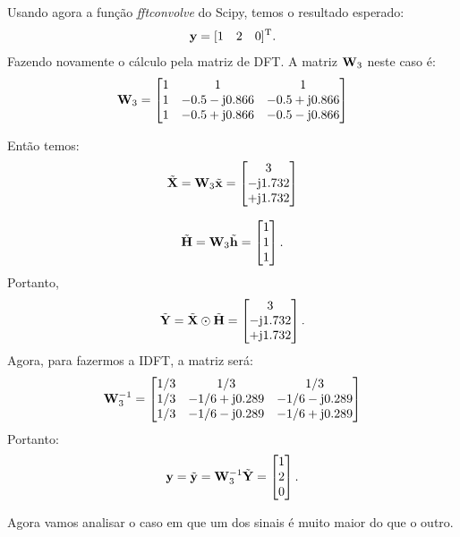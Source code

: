 \documentclass{homeworkclass}
\begin{document}
\begin{homeworkProblem}
\begin{equation*}
	\end{equation*}
	Usando agora a função \textit{fftconvolve} do Scipy, temos o resultado esperado:
	\begin{equation*}
	\mathbf{y} = [1 \quad 2 \quad 0]^{\mathrm{T}}. 
	\end{equation*}
	Fazendo novamente o cálculo pela matriz de DFT. A matriz $\mathbf{W}_{3}$ neste caso é:
	\begin{equation*} \mathbf{W}_{3} = 
	\begin{bmatrix} 
	1  & 1 & 1 \\ 
	1 & -0.5-\mathrm{j}0.866 & -0.5+\mathrm{j}0.866 \\
	1 & -0.5+\mathrm{j}0.866 & -0.5-\mathrm{j}0.866	
	\end{bmatrix}
	\end{equation*}
	
	Então temos:
	\begin{equation*}
	\tilde{\mathbf{X}} = \mathbf{W}_{3}\tilde{\mathbf{x}} = 	\begin{bmatrix} 
	3 \\ 
	-\mathrm{j}1.732 \\
	+\mathrm{j}1.732
	\end{bmatrix}
	\end{equation*}

	\begin{equation*}
	\tilde{\mathbf{H}} = \mathbf{W}_{3}\tilde{\mathbf{h}} = 	\begin{bmatrix} 
	1 \\ 
	1 \\ 
	1 
	\end{bmatrix}.
	\end{equation*}
	Portanto,
	\begin{equation*}
	\tilde{\mathbf{Y}} = \tilde{\mathbf{X}} \odot \tilde{\mathbf{H}} = \begin{bmatrix} 
	3 \\ 
	-\mathrm{j}1.732 \\
	+\mathrm{j}1.732
	\end{bmatrix}.
	\end{equation*}
	Agora, para fazermos a IDFT, a matriz será:
	\begin{equation*}  \mathbf{W}_{3}^{-1} = 
	\begin{bmatrix} 
	1/3  & 1/3 & 1/3 \\ 
	1/3 & -1/6 +\mathrm{j}0.289 & -1/6-\mathrm{j}0.289 \\
	1/3 & -1/6 -\mathrm{j}0.289 & -1/6+\mathrm{j}0.289	
	\end{bmatrix}
	\end{equation*}
	Portanto:
	\begin{equation*}
	\mathbf{y} = \tilde{\mathbf{y}} = \mathbf{W}_{3}^{-1} \tilde{\mathbf{Y}} = \begin{bmatrix} 
	1 \\ 
	2 \\
	0
	\end{bmatrix}.
	\end{equation*}	
	
	Agora vamos analisar o caso em que um dos sinais é muito maior do que o outro.
	
\end{homeworkProblem}
\end{document}
